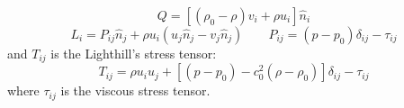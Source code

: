   \begin{equation}
    \label{eq:mass-source-non-convective}
  Q = \left[\left( \rho_0 - \rho \right)v_i + \rho u_i \right] \hat{n}_i
  \end{equation}
  \begin{equation}
    \label{eq:momentum-source-non-convective}
    L_i = P_{ij}\hat{n}_j + \rho u_i \left( u_j \hat{n}_j - v_j \hat{n}_j \right) \qquad P_{ij} = \left( p - p_0 \right)\delta_{ij} - \tau_{ij}
  \end{equation}
  and $T_{ij}$ is the Lighthill's stress tensor:
  \begin{equation}
    \label{eq:Lighthill-tensor}
    T_{ij} = \rho u_i u_j + \left[  \left( p - p_0 \right) - c_0^2 \left( \rho - \rho_0 \right) \right]\delta_{ij} - \tau_{ij}
  \end{equation}
  where $\tau_{ij}$ is the viscous stress tensor.